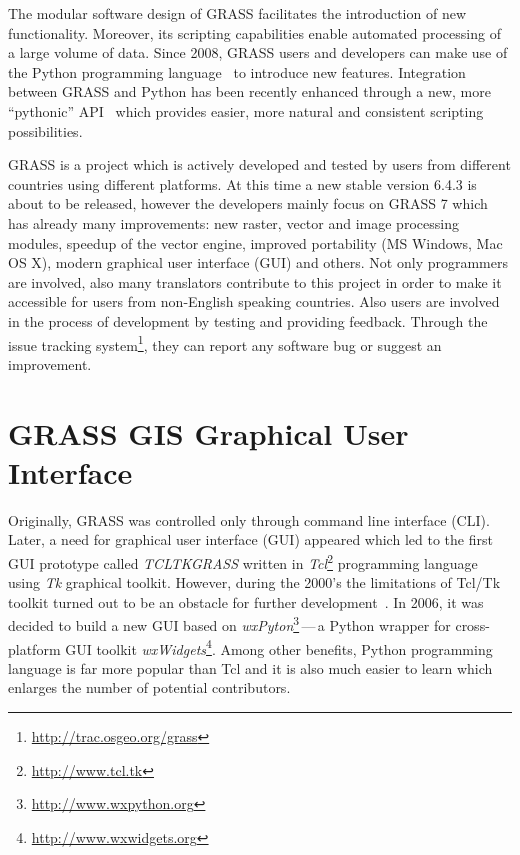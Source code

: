\documentclass[a4paper,12pt,oneside]{book}
\newcommand{\dash}{\mbox{\,---\,}}
\begin{document}
The modular software design of GRASS facilitates the introduction of new functionality.
Moreover, its scripting capabilities enable automated processing of a large volume of data.
Since 2008, GRASS users and developers can make use of the Python programming language~\cite{van1995python}
to introduce new features. Integration between GRASS and Python has been recently enhanced through a new,
more ``pythonic'' API~\cite{pygrass} which provides easier, more natural and consistent scripting possibilities.

GRASS is a project which is actively developed and tested by users from different
countries using different platforms.
At this time a new stable version 6.4.3 is about to be released, however
the developers mainly focus on GRASS 7 which has already many improvements:
new raster, vector and image processing modules, speedup of the vector engine,
improved portability (MS Windows, Mac OS X), modern graphical user interface (GUI) and others.
Not only programmers are involved, also many translators contribute to this project
in order to make it accessible for users from non-English speaking countries.
Also users are involved in the process of development by testing and providing feedback.
Through the issue tracking system\footnote{\url{http://trac.osgeo.org/grass}},
they can report any software bug or suggest an improvement.


\section{GRASS GIS Graphical User Interface}
\label{sec:grasswxgui}
Originally, GRASS was controlled only through command line interface (CLI).
Later, a need for graphical user interface (GUI) appeared
which led to the first GUI prototype called \emph{TCLTKGRASS}
written in \emph{Tcl}\footnote{\url{http://www.tcl.tk}}
programming language using \emph{Tk} graphical toolkit.
However, during the 2000's the limitations of Tcl/Tk toolkit turned out to be
an obstacle for further development~\cite{wxGUI2008}.
In 2006, it was decided to build a new GUI based on
\emph{wxPyton}\footnote{\url{http://www.wxpython.org}}\dash  a Python wrapper
for cross-platform GUI toolkit \emph{wxWidgets}\footnote{\url{http://www.wxwidgets.org}}.
Among other benefits, Python programming language is far more popular than Tcl
and it is also much easier to learn which enlarges the number of potential contributors.
\end{document}
